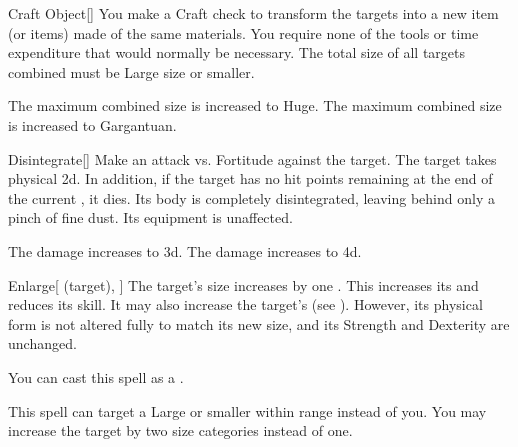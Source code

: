 \lowercase{\hypertarget{spell:Craft Object}{}}\label{spell:Craft Object}
\begin{freeability}[Rank 4]{\hypertarget{spell:Craft Object}{Craft Object}}[]
You make a Craft check to transform the targets into a new item (or items) made of the same materials.
You require none of the tools or time expenditure that would normally be necessary.
The total size of all targets combined must be Large size or smaller.

\rankline
{} The maximum combined size is increased to Huge.
 The maximum combined size is increased to Gargantuan.

\end{freeability}
\vspace{0.25em}



\lowercase{\hypertarget{spell:Disintegrate}{}}\label{spell:Disintegrate}
\begin{freeability}[Rank 4]{\hypertarget{spell:Disintegrate}{Disintegrate}}[]
Make an attack vs. Fortitude against the target.
\hit The target takes physical  \plus2d.
In addition, if the target has no hit points remaining at the end of the current , it dies.
Its body is completely disintegrated, leaving behind only a pinch of fine dust.
Its equipment is unaffected.

\rankline
{} The damage increases to  \plus3d.
 The damage increases to  \plus4d.

\end{freeability}
\vspace{0.25em}



\lowercase{\hypertarget{spell:Enlarge}{}}\label{spell:Enlarge}
\begin{attuneability}[Rank 4]{\hypertarget{spell:Enlarge}{Enlarge}}[ (target), ]
The target's size increases by one .
This increases its  and reduces its  skill.
It may also increase the target's  (see ).
However, its physical form is not altered fully to match its new size, and its Strength and Dexterity are unchanged.

You can cast this spell as a .

\rankline
{} This spell can target a Large or smaller  within \rngmed range instead of you.
 You may increase the target by two size categories instead of one.

\end{attuneability}
\vspace{0.25em}



